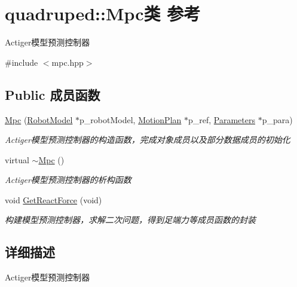\hypertarget{classquadruped_1_1Mpc}{}\section{quadruped\+:\+:Mpc类 参考}
\label{classquadruped_1_1Mpc}


Actiger模型预测控制器  




{\ttfamily \#include $<$mpc.\+hpp$>$}

\subsection*{Public 成员函数}
\begin{DoxyCompactItemize}
\item 
\hyperlink{classquadruped_1_1Mpc_a4bc02766e7c00d69044af00b9c451802}{Mpc} (\hyperlink{classquadruped_1_1RobotModel}{Robot\+Model} $\ast$p\+\_\+robot\+Model, \hyperlink{classquadruped_1_1MotionPlan}{Motion\+Plan} $\ast$p\+\_\+ref, \hyperlink{classquadruped_1_1Parameters}{Parameters} $\ast$p\+\_\+para)
\begin{DoxyCompactList}\small\item\em Actiger模型预测控制器的构造函数，完成对象成员以及部分数据成员的初始化 \end{DoxyCompactList}\item 
\mbox{\label{classquadruped_1_1Mpc_a54e96389912459abc9b7ec45741c9ce9}} 
virtual \hyperlink{classquadruped_1_1Mpc_a54e96389912459abc9b7ec45741c9ce9}{$\sim$\+Mpc} ()
\begin{DoxyCompactList}\small\item\em Actiger模型预测控制器的析构函数 \end{DoxyCompactList}\item 
\mbox{\label{classquadruped_1_1Mpc_a3f15737db0a0c201de83d5733d1f20f3}} 
void \hyperlink{classquadruped_1_1Mpc_a3f15737db0a0c201de83d5733d1f20f3}{Get\+React\+Force} (void)
\begin{DoxyCompactList}\small\item\em 构建模型预测控制器，求解二次问题，得到足端力等成员函数的封装 \end{DoxyCompactList}\end{DoxyCompactItemize}


\subsection{详细描述}
Actiger模型预测控制器 

